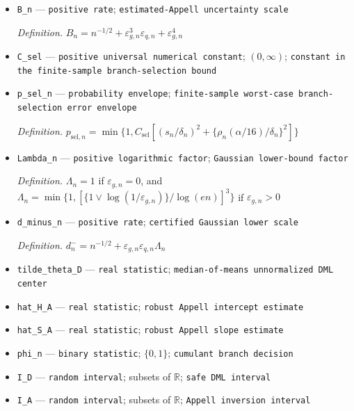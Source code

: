 \documentclass{article}
\begin{document}
\begin{itemize}
  \item \texttt{B\_\allowbreak{}n} --- \texttt{positive rate}; \texttt{estimated-\allowbreak{}Appell uncertainty scale}
  \par\smallskip\noindent\emph{Definition.} \(B_n=n^{-1/2}+\varepsilon_{g,n}^3\varepsilon_{q,n}+\varepsilon_{g,n}^4\)
  \item \texttt{C\_\allowbreak{}sel} --- \texttt{positive universal numerical constant}; \((0,\infty)\); \texttt{constant in the finite-\allowbreak{}sample branch-\allowbreak{}selection bound}
  \item \texttt{p\_\allowbreak{}sel\_\allowbreak{}n} --- \texttt{probability envelope}; \texttt{finite-\allowbreak{}sample worst-\allowbreak{}case branch-\allowbreak{}selection error envelope}
  \par\smallskip\noindent\emph{Definition.} \(p_{\mathrm{sel},n}=\min\{1,C_{\mathrm{sel}}[(s_n/\delta_n)^2+\{\rho_n(\alpha/16)/\delta_n\}^2]\}\)
  \item \texttt{Lambda\_\allowbreak{}n} --- \texttt{positive logarithmic factor}; \texttt{Gaussian lower-\allowbreak{}bound factor}
  \par\smallskip\noindent\emph{Definition.} \(\Lambda_n=1\) if \(\varepsilon_{g,n}=0\), and \(\Lambda_n=\min\{1,[\{1\vee\log(1/\varepsilon_{g,n})\}/\log(en)]^3\}\) if \(\varepsilon_{g,n}>0\)
  \item \texttt{d\_\allowbreak{}minus\_\allowbreak{}n} --- \texttt{positive rate}; \texttt{certified Gaussian lower scale}
  \par\smallskip\noindent\emph{Definition.} \(d_n^-=n^{-1/2}+\varepsilon_{g,n}\varepsilon_{q,n}\Lambda_n\)
  \item \texttt{tilde\_\allowbreak{}theta\_\allowbreak{}D} --- \texttt{real statistic}; \texttt{median-\allowbreak{}of-\allowbreak{}means unnormalized DML center}
  \item \texttt{hat\_\allowbreak{}H\_\allowbreak{}A} --- \texttt{real statistic}; \texttt{robust Appell intercept estimate}
  \item \texttt{hat\_\allowbreak{}S\_\allowbreak{}A} --- \texttt{real statistic}; \texttt{robust Appell slope estimate}
  \item \texttt{phi\_\allowbreak{}n} --- \texttt{binary statistic}; \(\{0,1\}\); \texttt{cumulant branch decision}
  \item \texttt{I\_\allowbreak{}D} --- \texttt{random interval}; subsets of \(\mathbb R\); \texttt{safe DML interval}
  \item \texttt{I\_\allowbreak{}A} --- \texttt{random interval}; subsets of \(\mathbb R\); \texttt{Appell inversion interval}

\end{itemize}
\end{document}

